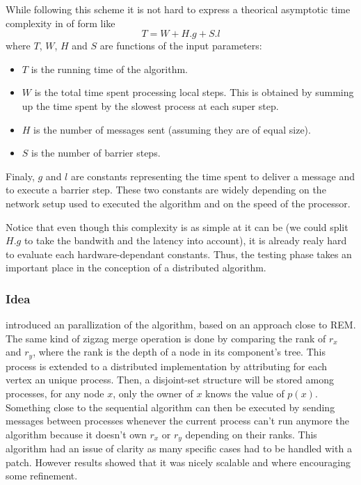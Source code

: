 \documentclass[12px]{article}
\begin{document}
        While following this scheme it is not hard to express a theorical asymptotic time complexity in of form like
          \[ T = W + H.g + S.l \]
        where $T$, $W$, $H$ and $S$ are functions of the input parameters:
          \begin{itemize}
            \item $T$ is the running time of the algorithm.
            \item $W$ is the total time spent processing local steps. This is obtained by summing up the time spent by the slowest process at each super step.
            \item $H$ is the number of messages sent (assuming they are of equal size).
            \item $S$ is the number of barrier steps.
          \end{itemize}
        Finaly, $g$ and $l$ are constants representing the time spent to deliver a message and to execute a barrier step. These two constants are widely depending on the network setup used to executed the algorithm and on the speed of the processor.

        Notice that even though this complexity is as simple at it can be (we could split $H.g$ to take the bandwith and the latency into account), it is already realy hard to evaluate each hardware-dependant constants. Thus, the testing phase takes an important place in the conception of a distributed algorithm.

      \subsubsection{Idea}
         introduced an parallization of the algorithm, based on an approach close to REM\@.
        The same kind of zigzag merge operation is done by comparing the rank of $r_x$ and $r_y$, where the rank is the depth of a node in its component's tree.
        This process is extended to a distributed implementation by attributing for each vertex an unique process. Then, a disjoint-set structure will be stored among processes, for any node $x$, only the owner of $x$ knows the value of $p(x)$.
        Something close to the sequential algorithm can then be executed by sending messages between processes whenever the current process can't run anymore the algorithm because it doesn't own $r_x$ or $r_y$ depending on their ranks.
        This algorithm had an issue of clarity as many specific cases had to be handled with a patch. However results showed that it was nicely scalable and where encouraging some refinement.
\end{document}
